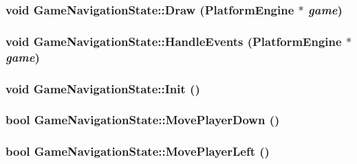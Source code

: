 \hypertarget{class_game_navigation_state_06e4fc064c040cf230fb425bfe9eb96c}{
\subsubsection[{Draw}]{\setlength{\rightskip}{0pt plus 5cm}void GameNavigationState::Draw ({\bf PlatformEngine} $\ast$ {\em game})}}
\label{class_game_navigation_state_06e4fc064c040cf230fb425bfe9eb96c}


\hypertarget{class_game_navigation_state_1903be15338da11029cb5ec22729bce2}{
\subsubsection[{HandleEvents}]{\setlength{\rightskip}{0pt plus 5cm}void GameNavigationState::HandleEvents ({\bf PlatformEngine} $\ast$ {\em game})}}
\label{class_game_navigation_state_1903be15338da11029cb5ec22729bce2}


\hypertarget{class_game_navigation_state_8f613860bf544476ab9cff9fb7f98201}{
\subsubsection[{Init}]{\setlength{\rightskip}{0pt plus 5cm}void GameNavigationState::Init ()}}
\label{class_game_navigation_state_8f613860bf544476ab9cff9fb7f98201}


\hypertarget{class_game_navigation_state_66f8a21e63270473d88b31b06d306111}{
\subsubsection[{MovePlayerDown}]{\setlength{\rightskip}{0pt plus 5cm}bool GameNavigationState::MovePlayerDown ()}}
\label{class_game_navigation_state_66f8a21e63270473d88b31b06d306111}


\hypertarget{class_game_navigation_state_b8ee346a4f4be2cc3478fdacfb770464}{
\subsubsection[{MovePlayerLeft}]{\setlength{\rightskip}{0pt plus 5cm}bool GameNavigationState::MovePlayerLeft ()}}
\label{class_game_navigation_state_b8ee346a4f4be2cc3478fdacfb770464}



